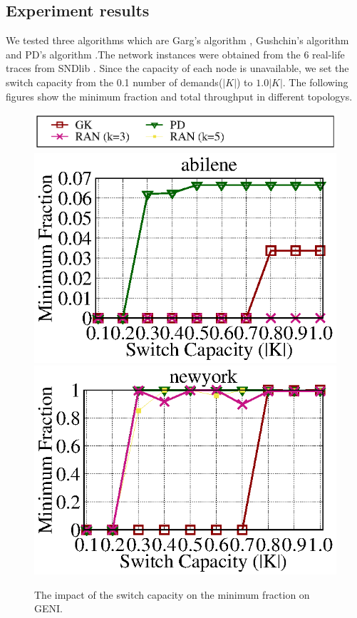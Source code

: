 \documentclass[a4paper,12pt]{report}
\begin{document}
\begin{large}
  \chapter{Experiment results}
  \qquad We tested three algorithms which are Garg’s algorithm \cite{grag}, Gushchin’s algorithm \cite{gk} and PD's algorithm \cite{our}.The network instances were obtained from the 6 real-life traces from SNDlib \cite{SNDlib}. Since the capacity of each node is unavailable, we set the switch capacity from the 0.1 number of demands($|K|$) to $1.0|K|$. The following figures show the  minimum fraction and total throughput in different topologys.
  \begin{figure}[ht]
    \caption{The impact of the switch capacity on the minimum fraction on GENI.}
	\centering
	  \includegraphics[width=1.0\textwidth]{lambda_legend.eps}
	  \includegraphics[width=1.0\textwidth]{abilene_geni_lambda_e05.eps}
	  \includegraphics[width=1.0\textwidth]{newyork_geni_lambda_e05.eps}

\end{figure}
\end{large}
\end{document}
